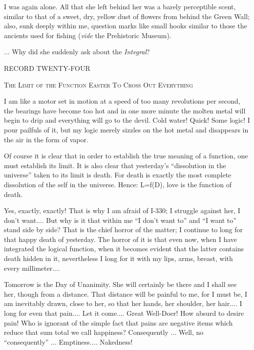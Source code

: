 \documentclass[11pt,openany]{book}
\begin{document}
I was again alone. All that she left behind her was a barely perceptible scent, similar to that of a sweet, dry, yellow dust of flowers from behind the Green Wall; also, sunk deeply within me, question marks like small hooks similar to those the ancients used for fishing (\emph{vide} the Prehistoric Museum).

... Why did she suddenly ask about the \emph{Integral}?

\begin{center}\textsc{RECORD TWENTY-FOUR}\end{center}

\begin{center}\textsc{The Limit of the Function Easter To Cross Out Everything}\end{center}

I am like a motor set in motion at a speed of too many revolutions per second, the bearings have become too hot and in one more minute the molten metal will begin to drip and everything will go to the devil. Cold water! Quick! Some logic! I pour pailfuls of it, but my logic merely sizzles on the hot metal and disappears in the air in the form of vapor.

Of course it is clear that in order to establish the true meaning of a function, one must establish its limit. It is also clear that yesterday's ``dissolution in the universe'' taken to its limit is death. For death is exactly the most complete dissolution of the self in the universe. Hence: L=f(D), love is the function of death.

Yes, exactly, exactly! That is why I am afraid of I-330; I struggle against her, I don't want.... But why is it that within me ``I don't want to'' and ``I want to'' stand side by side? That is the chief horror of the matter; I continue to long for that happy death of yesterday. The horror of it is that even now, when I have integrated the logical function, when it becomes evident that the latter contains death hidden in it, nevertheless I long for it with my lips, arms, breast, with every millimeter....

Tomorrow is the Day of Unanimity. She will certainly be there and I shall see her, though from a distance. That distance will be painful to me, for I must be, I am inevitably drawn, close to her, so that her hands, her shoulder, her hair.... I long for even that pain.... Let it come.... Great Well-Doer! How absurd to desire pain! Who is ignorant of the simple fact that pains are negative items which reduce that sum total we call happiness? Consequently ... Well, no ``consequently'' ... Emptiness.... Nakedness!
\end{document}
